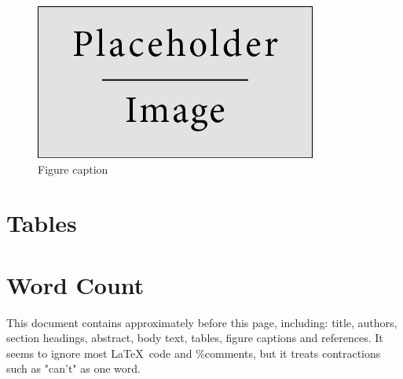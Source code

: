\begin{figure}[ht!]
\centering\includegraphics[width=0.4\linewidth]{figures/placeholder}
\caption{Figure caption}
\end{figure}



\newpage
\section*{Tables}



\newpage





\newpage

\section*{Word Count}

This document contains approximately {\large \textbf{\wordcount}} before this page, including: title, authors, section headings, abstract, body text, tables, figure captions and references. It seems to ignore most \LaTeX \ code and \%comments, but it treats contractions such as "can't" as one word.


